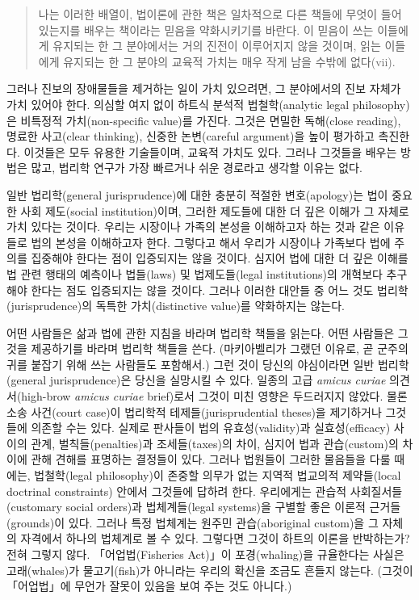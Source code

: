 \begin{quote}
나는 이러한 배열이, 법이론에 관한 책은 일차적으로 다른 책들에 무엇이
들어 있는지를 배우는 책이라는 믿음을 약화시키기를 바란다. 이 믿음이 쓰는
이들에게 유지되는 한 그 분야에서는 거의 진전이 이루어지지 않을 것이며,
읽는 이들에게 유지되는 한 그 분야의 교육적 가치는 매우 작게 남을 수밖에
없다(vii).
\end{quote}

그러나 진보의 장애물들을 제거하는 일이 가치 있으려면, 그 분야에서의 진보
자체가 가치 있어야 한다. 의심할 여지 없이 하트식 분석적 법철학(analytic
legal philosophy)은 비특정적 가치(non-specific value)를 가진다. 그것은
면밀한 독해(close reading), 명료한 사고(clear thinking), 신중한
논변(careful argument)을 높이 평가하고 촉진한다. 이것들은 모두 유용한
기술들이며, 교육적 가치도 있다. 그러나 그것들을 배우는 방법은 많고,
법리학 연구가 가장 빠르거나 쉬운 경로라고 생각할 이유는 없다.

일반 법리학(general jurisprudence)에 대한 충분히 적절한 변호(apology)는
법이 중요한 사회 제도(social institution)이며, 그러한 제도들에 대한 더
깊은 이해가 그 자체로 가치 있다는 것이다. 우리는 시장이나 가족의 본성을
이해하고자 하는 것과 같은 이유들로 법의 본성을 이해하고자 한다. 그렇다고
해서 우리가 시장이나 가족보다 법에 주의를 집중해야 한다는 점이
입증되지는 않을 것이다. 심지어 법에 대한 더 깊은 이해를 법 관련 행태의
예측이나 법들(laws) 및 법제도들(legal institutions)의 개혁보다 추구해야
한다는 점도 입증되지는 않을 것이다. 그러나 이러한 대안들 중 어느 것도
법리학(jurisprudence)의 독특한 가치(distinctive value)를 약화하지는
않는다.

어떤 사람들은 삶과 법에 관한 지침을 바라며 법리학 책들을 읽는다. 어떤
사람들은 그것을 제공하기를 바라며 법리학 책들을 쓴다. (마키아벨리가
그랬던 이유로, 곧 군주의 귀를 붙잡기 위해 쓰는 사람들도 포함해서.) 그런
것이 당신의 야심이라면 일반 법리학(general jurisprudence)은 당신을
실망시킬 수 있다. 일종의 고급 \emph{amicus curiae} 의견서(high-brow
\emph{amicus curiae} brief)로서 그것이 미친 영향은 두드러지지 않았다.
물론 소송 사건(court case)이 법리학적 테제들(jurisprudential theses)을
제기하거나 그것들에 의존할 수는 있다. 실제로 판사들이 법의
유효성(validity)과 실효성(efficacy) 사이의 관계, 벌칙들(penalties)과
조세들(taxes)의 차이, 심지어 법과 관습(custom)의 차이에 관해 견해를
표명하는 결정들이 있다. 그러나 법원들이 그러한 물음들을 다룰 때에는,
법철학(legal philosophy)이 존중할 의무가 없는 지역적 법교의적
제약들(local doctrinal constraints) 안에서 그것들에 답하려 한다.
우리에게는 관습적 사회질서들(customary social orders)과 법체계들(legal
systems)을 구별할 좋은 이론적 근거들(grounds)이 있다. 그러나 특정
법체계는 원주민 관습(aboriginal custom)을 그 자체의 자격에서 하나의
법체계로 볼 수 있다. 그렇다면 그것이 하트의 이론을 반박하는가? 전혀
그렇지 않다. 「어업법(Fisheries Act)」이 포경(whaling)을 규율한다는
사실은 고래(whales)가 물고기(fish)가 아니라는 우리의 확신을 조금도
흔들지 않는다. (그것이 「어업법」에 무언가 잘못이 있음을 보여 주는 것도
아니다.)

